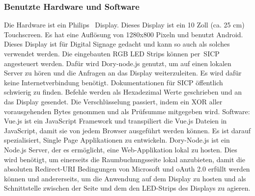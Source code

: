 \subsubsection{Benutzte Hardware und Software}
\newline
Die Hardware ist ein Philips~\cite{10BDL4551T/00} Display.
Dieses Display ist ein 10 Zoll (ca. 25 cm) Touchscreen.
Es hat eine Auflösung von 1280x800 Pixeln und benutzt Android.
Dieses Display ist für Digital Signage gedacht und kann so auch als solches verwendet werden.
Die eingebauten RGB LED Strips können per~\gls{SICP} angesteuert werden.
Dafür wird Dory-node.js genutzt, um auf einen lokalen Server zu hören und die Anfragen an das Display weiterzuleiten.
Es wird dafür keine Internetverbindung benötigt.
Dokumentationen für SICP öffentlich schwierig zu finden.
Befehle werden als Hexadezimal Werte geschrieben und an das Display gesendet.
Die Verschlüsselung passiert, indem ein XOR aller vorausgehenden Bytes genommen und als Prüfsumme mitgegeben wird.
\newline
\newline
Software:
\newline
Vue.js ist ein JavaScript Framework und transpiliert die Vue.js Dateien in JavaScript, damit sie von jedem Browser ausgeführt werden können.
Es ist darauf spezialisiert, Single Page Applikationen zu entwickeln.
\newline
\newline
{}
Dory-Node.js ist ein Node.js Server, der es ermöglicht, eine Web-Applikation lokal zu hosten.
Dies wird benötigt, um einerseits die Raumbuchungsseite lokal anzubieten, damit die absoluten Redirect-URI Bedingungen von Microsoft und oAuth 2.0 erfüllt werden können und andererseits, um die Anwendung auf dem Display zu hosten und als Schnittstelle zwischen der Seite und dem den LED-Strips des Displays zu agieren.
\newline
\newline
